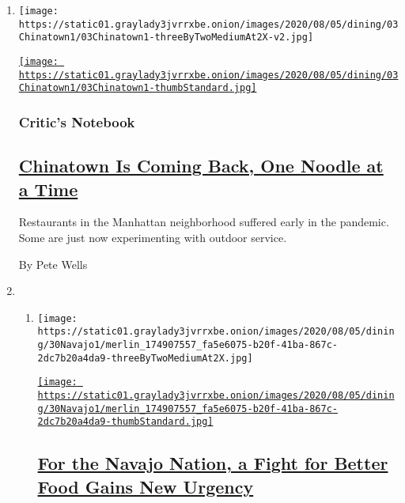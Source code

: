 \begin{enumerate}
\def\labelenumi{\arabic{enumi}.}
\item
  \texttt{[image: https://static01.graylady3jvrrxbe.onion/images/2020/08/05/dining/03Chinatown1/03Chinatown1-threeByTwoMediumAt2X-v2.jpg]}

  \href{/2020/08/03/dining/chinatown-outdoor-dining-coronavirus.html}{\texttt{[image: https://static01.graylady3jvrrxbe.onion/images/2020/08/05/dining/03Chinatown1/03Chinatown1-thumbStandard.jpg]}}

  \hypertarget{critics-notebook}{%
  \subsubsection{Critic's Notebook}\label{critics-notebook}}

  \hypertarget{chinatown-is-coming-back-one-noodle-at-a-time}{%
  \subsection{\texorpdfstring{\href{/2020/08/03/dining/chinatown-outdoor-dining-coronavirus.html}{Chinatown
  Is Coming Back, One Noodle at a
  Time}}{Chinatown Is Coming Back, One Noodle at a Time}}\label{chinatown-is-coming-back-one-noodle-at-a-time}}

  Restaurants in the Manhattan neighborhood suffered early in the
  pandemic. Some are just now experimenting with outdoor service.

  By Pete Wells
\item
  \begin{enumerate}
  \def\labelenumii{\arabic{enumii}.}
  \item
    \texttt{[image: https://static01.graylady3jvrrxbe.onion/images/2020/08/05/dining/30Navajo1/merlin\_174907557\_fa5e6075-b20f-41ba-867c-2dc7b20a4da9-threeByTwoMediumAt2X.jpg]}

    \href{/2020/08/03/dining/navajo-nation-food-coronavirus.html}{\texttt{[image: https://static01.graylady3jvrrxbe.onion/images/2020/08/05/dining/30Navajo1/merlin\_174907557\_fa5e6075-b20f-41ba-867c-2dc7b20a4da9-thumbStandard.jpg]}}

    \hypertarget{for-the-navajo-nation-a-fight-for-better-food-gains-new-urgency}{%
    \subsection{\texorpdfstring{\href{/2020/08/03/dining/navajo-nation-food-coronavirus.html}{For
    the Navajo Nation, a Fight for Better Food Gains New
    Urgency}}{For the Navajo Nation, a Fight for Better Food Gains New Urgency}}\label{for-the-navajo-nation-a-fight-for-better-food-gains-new-urgency}}


\end{enumerate}
\end{enumerate}
